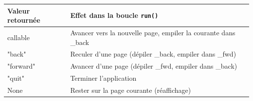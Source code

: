 \documentclass[12pt,a4paper]{article}
\begin{document}
\begin{center}
\begin{tabular}{>{\ttfamily}p{4cm} p{9.5cm}}
\toprule
\textbf{Valeur retournée} & \textbf{Effet dans la boucle \texttt{run()}} \\
\midrule
callable & Avancer vers la nouvelle page, empiler la courante dans \_back \\
"back" & Reculer d'une page (dépiler \_back, empiler dans \_fwd) \\
"forward" & Avancer d'une page (dépiler \_fwd, empiler dans \_back) \\
"quit" & Terminer l'application \\
None & Rester sur la page courante (réaffichage) \\
\bottomrule
\end{tabular}
\end{center}
\end{document}
